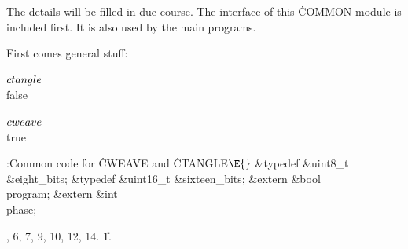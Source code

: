 The details will be filled in due course.  The interface  of this
\.{COMMON} module is included first.  It is also used by the main programs.








First comes general stuff:



\Y\B\4\D$\\{ctangle}$ \5
\\{false}\par
\B\4\D$\\{cweave}$ \5
\\{true}\par
\Y\B\4:Common code for \.{CWEAVE} and \.{CTANGLE}\X${}\E{}$\6
\&{typedef} \&{uint8\_t} \&{eight\_bits};\6
\&{typedef} \&{uint16\_t} \&{sixteen\_bits};\6
\&{extern} \&{bool} \\{program};\6
\&{extern} \&{int} \\{phase};\par
{}, 6, 7, 9, 10, 12, 14.
\U1.\fi

